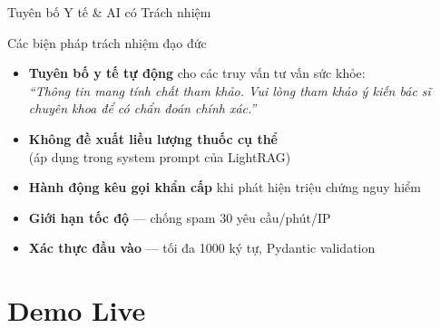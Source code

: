 \documentclass[aspectratio=169, 11pt]{beamer}
\begin{document}
\begin{frame}{Tuyên bố Y tế \& AI có Trách nhiệm}
  \begin{block}{Các biện pháp trách nhiệm đạo đức}
    \begin{itemize}
      \item \textbf{Tuyên bố y tế tự động} cho các truy vấn tư vấn sức khỏe:\\
        \textit{``Thông tin mang tính chất tham khảo. Vui lòng tham khảo ý kiến bác sĩ chuyên khoa để có chẩn đoán chính xác.''}
        \vspace{4pt}
      \item \textbf{Không đề xuất liều lượng thuốc cụ thể}\\
        (áp dụng trong system prompt của LightRAG)
        \vspace{4pt}
      \item \textbf{Hành động kêu gọi khẩn cấp} khi phát hiện triệu chứng nguy hiểm
        \vspace{4pt}
      \item \textbf{Giới hạn tốc độ} --- chống spam 30 yêu cầu/phút/IP
        \vspace{4pt}
      \item \textbf{Xác thực đầu vào} --- tối đa 1000 ký tự, Pydantic validation
    \end{itemize}
  \end{block}
\end{frame}

\section{Demo Live}
\end{document}
